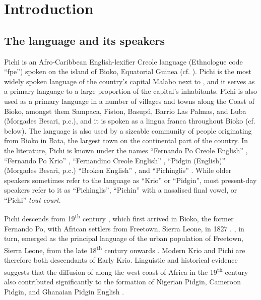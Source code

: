 \chapter{Introduction}
\section{The language and its speakers}\label{sec:1.1}

Pichi is an Afro-Caribbean English-lexifier Creole language (Ethnologue code “fpe”) spoken on the island of Bioko, Equatorial Guinea (cf. ). Pichi is the most widely spoken language of the country’s capital Malabo next to , and it serves as a primary language to a large proportion of the capital’s inhabitants. Pichi is also used as a primary language in a number of villages and towns along the Coast of Bioko, amongst them Sampaca, Fiston, Basupú, Barrio Las Palmas, and Luba (Morgades Besari, p.c.), and it is spoken as a lingua franca throughout Bioko (cf.  below). The language is also used by a sizeable community of people originating from Bioko in Bata, the largest town on the continental part of the country. In the literature, Pichi is known under the names “Fernando Po Creole English” \citep{SimonsFennig2017}, “Fernando Po Krio” \citep{Berry1970},  “Fernandino Creole English” \citep{Holm1988}, “Pidgin (English)” (Morgades Besari, p.c.) “Broken English” \citep{Zarco1938}, and “Pichinglis” \citep{Lipski1992}. While older speakers sometimes refer to the language as “Krio” or “Pidgin”, most present-day speakers refer to it as “Pichinglis”, “Pichin” with a nasalised final vowel, or “Pichi” \textit{tout court}. 

Pichi descends from 19\textsuperscript{th} century , which first arrived in Bioko, the former Fernando Po, with African settlers from Freetown, Sierra Leone, in 1827 \citep[165]{Fyfe1962}. , in turn, emerged as the principal language of the urban population of Freetown, Sierra Leone, from the late 18\textsuperscript{th} century onwards \citep{Huber1999}. Modern Krio and Pichi are therefore both descendants of Early Krio. Linguistic and historical evidence suggests that the diffusion of  along the west coast of Africa in the 19\textsuperscript{th} century also contributed significantly to the formation of Nigerian Pidgin, Cameroon Pidgin, and Ghanaian Pidgin English \citep{Huber1999}. 

